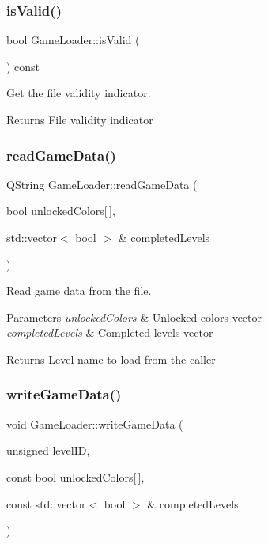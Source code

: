 \subsubsection{\texorpdfstring{is\+Valid()}{isValid()}}
{\footnotesize\ttfamily bool Game\+Loader\+::is\+Valid (\begin{DoxyParamCaption}{ }\end{DoxyParamCaption}) const}



Get the file validity indicator. 

\begin{DoxyReturn}{Returns}
File validity indicator 
\end{DoxyReturn}
\mbox{\label{class_game_loader_ac255d6d8ade43f4ee3e760495f58ff4a}} 
\subsubsection{\texorpdfstring{read\+Game\+Data()}{readGameData()}}
{\footnotesize\ttfamily Q\+String Game\+Loader\+::read\+Game\+Data (\begin{DoxyParamCaption}\item[{bool}]{unlocked\+Colors\mbox{[}$\,$\mbox{]},  }\item[{std\+::vector$<$ bool $>$ \&}]{completed\+Levels }\end{DoxyParamCaption})}



Read game data from the file. 


\begin{DoxyParams}{Parameters}
{\em unlocked\+Colors} & Unlocked colors vector \\
\hline
{\em completed\+Levels} & Completed levels vector \\
\hline
\end{DoxyParams}
\begin{DoxyReturn}{Returns}
\hyperlink{class_level}{Level} name to load from the caller 
\end{DoxyReturn}
\mbox{\label{class_game_loader_aa597ca460dd45081cfbbfc3f71a75c5a}} 
\subsubsection{\texorpdfstring{write\+Game\+Data()}{writeGameData()}}
{\footnotesize\ttfamily void Game\+Loader\+::write\+Game\+Data (\begin{DoxyParamCaption}\item[{unsigned}]{level\+ID,  }\item[{const bool}]{unlocked\+Colors\mbox{[}$\,$\mbox{]},  }\item[{const std\+::vector$<$ bool $>$ \&}]{completed\+Levels }\end{DoxyParamCaption})}



